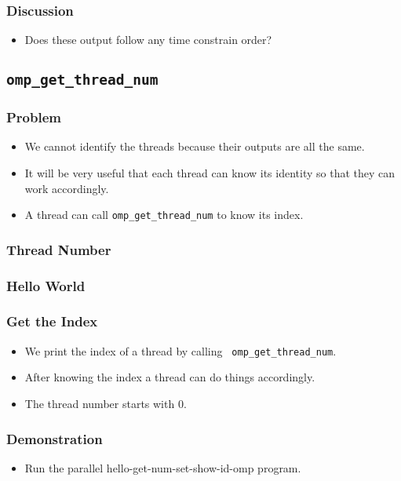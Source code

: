\documentclass{beamer}
\begin{document}
\begin{frame}
\frametitle{Discussion}
\begin{itemize}
\item Does these output follow any time constrain order?
\end{itemize}
\end{frame}

\subsection{\tt omp\_get\_thread\_num}

\begin{frame}
\frametitle{Problem}
\begin{itemize}
\item We cannot identify the threads because their outputs are all the
  same.
\item It will be very useful that each thread can know its identity so
  that they can work accordingly.
\item A thread can call {\tt omp\_get\_thread\_num} to know its index.
\end{itemize}
\end{frame}

\begin{frame}
\frametitle{Thread Number}
\end{frame}


\begin{frame}
\frametitle{Hello World}
\end{frame}

\begin{frame}
\frametitle{Get the Index}
\begin{itemize}
\item We print the index of a thread by calling {\tt
  omp\_get\_thread\_num}.
\item After knowing the index a thread can do things accordingly.
\item The thread number starts with 0.
\end{itemize}
\end{frame}

\begin{frame}
\frametitle{Demonstration}
\begin{itemize}
\item Run the parallel hello-get-num-set-show-id-omp program.
\end{itemize}
\end{frame}
\end{document}
